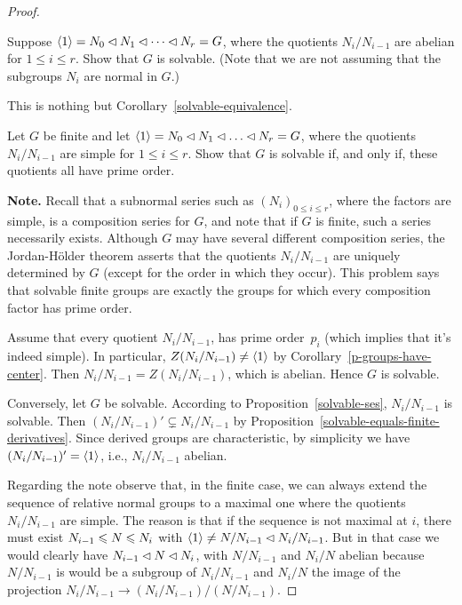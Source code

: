 \begin{solution}
\begin{proof}
\begin{probl}
    Suppose\/ $\langle1\rangle = N_0\lhd N_1 \lhd \cdots \lhd N_r = G$, where the quotients\/ $N_i / N_{i-1}$ are abelian for\/ $1\le i\le r$. Show that\/ $G$ is solvable. (Note that we are not assuming that the subgroups\/ $N_i$ are normal in\/ $G$.)
\end{probl}

\begin{solution} This is nothing but Corollary~\ref{solvable-equivalence}.  \end{solution}

\begin{probl}
    Let\/ $G$ be finite and let\/ $\gen1 = N_0\normal N_1\normal \dots\normal N_r = G$, where the quotients\/ $N_i/N_{i-1}$ are simple for\/ $1\le i\le r$. Show that\/ $G$ is solvable if, and only if, these quotients all have prime order.

    \textrm{\rm\textbf{Note.} Recall that a subnormal series such as $(N_i)_{0\le i\le r}$, where the factors are simple, is a composition series for $G$, and note that if $G$ is finite, such a series necessarily exists. Although $G$ may have several different composition series, the Jordan-H\"older theorem asserts that the quotients $N_i/N_{i-1}$ are uniquely determined by $G$ (except for the order in which they occur). This problem says that solvable finite groups are exactly the groups for which every composition factor has prime order.}
\end{probl}

\begin{solution} 

Assume that every quotient $N_i/N_{i-1}$, has prime order~$p_i$ (which implies that it's indeed simple). In particular, $Z(N_i/N_{i-1})\ne\langle1\rangle$ by Corollary~\ref{p-groups-have-center}. Then $N_i/N_{i-1}=Z(N_i/N_{i-1})$, which is abelian. Hence $G$ is solvable.

Conversely, let $G$ be solvable. According to Proposition~\ref{solvable-ses}, $N_i/N_{i-1}$ is solvable. Then $(N_i/N_{i-1})'\varsubsetneq N_i/N_{i-1}$ by Proposition~\ref{solvable-equals-finite-derivatives}. Since derived groups are characteristic, by simplicity we have $(N_i/N_{i-1})'=\langle1\rangle$, i.e., $N_i/N_{i-1}$ abelian.  \end{solution}

Regarding the note observe that, in the finite case, we can always extend the sequence of relative normal groups to a maximal one where the quotients $N_i/N_{i-1}$ are simple. The reason is that if the sequence is not maximal at $i$, there must exist $N_{i-1}\leqslant N\leqslant N_i$ with $\langle1\rangle\ne N/N_{i-1}\lhd N_i/N_{i-1}$. But in that case we would clearly have $N_{i-1}\lhd N\lhd N_i$, with $N/N_{i-1}$ and $N_i/N$ abelian because $N/N_{i-1}$ is would be a subgroup of $N_i/N_{i-1}$ and $N_i/N$ the image of the projection $N_i/N_{i-1}\to (N_i/N_{i-1})/(N/N_{i-1})$.


\end{proof}
\end{solution}
